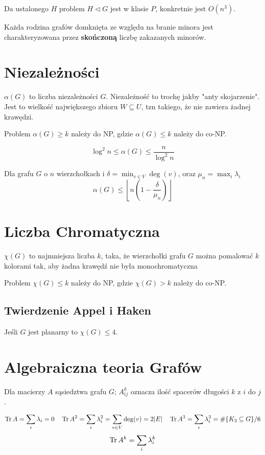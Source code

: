 \documentclass{../notatki}
\begin{document}
Da ustalonego $H$ problem $H \triangleleft G$ jest w klasie $P$, konkretnie jest
$O(n^3)$.

Każda rodzina grafów domknięta ze względu na branie minora jest charakteryzowana
przez \textbf{skończoną} liczbę zakazanych minorów.

\section{Niezależności}

$\alpha(G)$ to liczba niezależności $G$. Niezależność to trochę jakby "anty
skojarzenie". Jest to wielkość największego zbioru $W \subseteq U$, tzn takiego,
że nie zawiera żadnej krawędzi.

Problem $\alpha(G) \geq k$ należy do NP, gdzie $\alpha(G) \leq k$
należy do co-NP.

$$
\log^2n \leq \alpha(G) \leq \frac{n}{\log^2n}
$$

Dla grafu $G$ o $n$ wierzchołkach i $\delta = \min_{v \in V} \deg(v)$, oraz
$\mu_n = \max_{i} \lambda_i$
$$
\alpha(G) \leq \left\lfloor n\left(1 - \frac{\delta}{\mu_n}\right)\right\rfloor
$$

\section{Liczba Chromatyczna}

$\chi(G)$ to najmniejsza liczba $k$, taka, że wierzchołki grafu $G$
można pomalować $k$ kolorami tak, aby żadna krawędź nie była monochromatyczna

Problem $\chi(G) \leq k$ należy do NP, gdzie $\chi(G) > k$ należy do co-NP.

\subsection{Twierdzenie Appel i Haken}

Jeśli $G$ jest planarny to $\chi(G) \leq 4$.

\section{Algebraiczna teoria Grafów}

Dla macierzy $A$ sąsiedztwa grafu $G$; $A^k_{ij}$ oznacza ilość
spacerów długości $k$ z $i$ do $j$.

$$
\Tr A = \sum_i \lambda_i = 0 \quad \Tr A^2 = \sum_i \lambda_i^2 =
\sum_{v \in V} \deg(v) = 2|E| \quad \Tr A^3 = \sum_i \lambda_i^3
= \#\{K_3 \subseteq G\} / 6
$$
$$
\Tr A^k = \sum_i \lambda_i^k
$$
\end{document}
